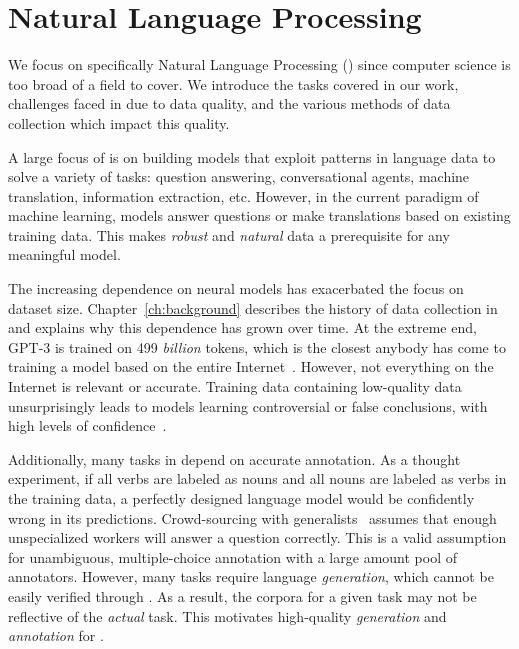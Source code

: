 
\section{Natural Language Processing}

We focus on specifically Natural Language Processing (\nlp{}) since computer science is too broad of a field to cover.  
%
We introduce the \nlp{} tasks covered in our work, challenges faced in \nlp{} due to data quality, and the various methods of data collection which impact this quality.  

A large focus of \nlp{} is on building models that exploit patterns in language data to solve a variety of tasks: question answering, conversational agents, machine translation, information extraction, etc.  
%
However, in the current paradigm of machine learning, models answer questions or make translations based on existing training data.
%
This makes \textit{robust} and \textit{natural} data a prerequisite for any meaningful model.  

The increasing dependence on neural models has exacerbated the focus on dataset size. 
%
Chapter~\ref{ch:background} describes the history of data collection in \nlp{} and explains why this dependence has grown over time.  
%
At the extreme end, GPT-3 is trained on 499 \textit{billion} tokens, which is the closest anybody has come to training a model based on the entire Internet~\citep{brown2020language}.  
%
However, not everything on the Internet is relevant or accurate.  
%
Training data containing low-quality data unsurprisingly leads to models learning controversial or false conclusions, with high levels of confidence~\citep{wolf2017we, wallace2019universal}. 
%

Additionally, many tasks in \nlp{} depend on accurate annotation.  
%
As a thought experiment, if all verbs are labeled as nouns and all nouns are labeled as verbs in the training data, a perfectly designed language model would be confidently wrong in its predictions.  
%
Crowd-sourcing with generalists~\citep{buhrmester2016amazon} assumes that enough unspecialized workers will answer a question correctly.  
%
This is a valid assumption for unambiguous, multiple-choice annotation with a large amount pool of annotators.  
%
However, many tasks require language \textit{generation}, which cannot be easily verified through \iaa{}.  
%
As a result, the \nlp{} corpora for a given task may not be reflective of the \textit{actual} task.
%
This motivates high-quality \textit{generation} and \textit{annotation} for \nlp{}.
 
